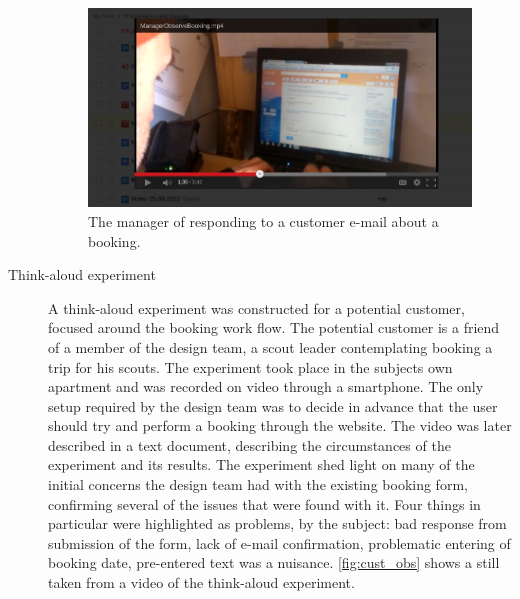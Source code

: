 \begin{description}
        \begin{figure}
            \includegraphics[width=\textwidth]{figures/observation}
            \caption{The manager of \gomonkey{ } responding to a customer e-mail
            about a booking. \label{fig:michel_obs}}
        \end{figure}

    \item [Think-aloud experiment] A think-aloud experiment was constructed for
        a potential customer, focused around the booking work flow. The
        potential customer is a friend of a member of the design team, a scout
        leader contemplating booking a trip for his scouts. The
        experiment took place in the subjects own apartment and was recorded on
        video through a smartphone. The only setup required by the design team
        was to decide in advance that the user should try and perform a booking
        through the \gomonkey{} website. The video was later described in a text
        document, describing the circumstances of the experiment and its
        results. The experiment shed light on many of the initial concerns the
        design team had with the existing booking form, confirming several of
        the issues that were found with it. Four things in particular were
        highlighted as problems, by the subject: bad response from submission of the form,
        lack of e-mail confirmation, problematic entering of booking date,
        pre-entered text was a nuisance. \autoref{fig:cust_obs} shows a still
        taken from a video of the think-aloud experiment.


\end{description}
